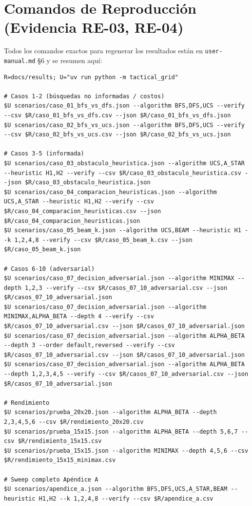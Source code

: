 \section{Comandos de Reproducción (Evidencia RE-03, RE-04)}
\label{sec:comandos-reproduccion}

Todos los comandos exactos para regenerar los resultados están en
\texttt{user-manual.md} §6 y se resumen aquí:

\begin{verbatim}
R=docs/results; U="uv run python -m tactical_grid"

# Casos 1-2 (búsquedas no informadas / costos)
$U scenarios/caso_01_bfs_vs_dfs.json --algorithm BFS,DFS,UCS --verify --csv $R/caso_01_bfs_vs_dfs.csv --json $R/caso_01_bfs_vs_dfs.json
$U scenarios/caso_02_bfs_vs_ucs.json --algorithm BFS,DFS,UCS --verify --csv $R/caso_02_bfs_vs_ucs.csv --json $R/caso_02_bfs_vs_ucs.json

# Casos 3-5 (informada)
$U scenarios/caso_03_obstaculo_heuristica.json --algorithm UCS,A_STAR --heuristic H1,H2 --verify --csv $R/caso_03_obstaculo_heuristica.csv --json $R/caso_03_obstaculo_heuristica.json
$U scenarios/caso_04_comparacion_heuristicas.json --algorithm UCS,A_STAR --heuristic H1,H2 --verify --csv $R/caso_04_comparacion_heuristicas.csv --json $R/caso_04_comparacion_heuristicas.json
$U scenarios/caso_05_beam_k.json --algorithm UCS,BEAM --heuristic H1 --k 1,2,4,8 --verify --csv $R/caso_05_beam_k.csv --json $R/caso_05_beam_k.json

# Casos 6-10 (adversarial)
$U scenarios/caso_07_decision_adversarial.json --algorithm MINIMAX --depth 1,2,3 --verify --csv $R/casos_07_10_adversarial.csv --json $R/casos_07_10_adversarial.json
$U scenarios/caso_07_decision_adversarial.json --algorithm MINIMAX,ALPHA_BETA --depth 4 --verify --csv $R/casos_07_10_adversarial.csv --json $R/casos_07_10_adversarial.json
$U scenarios/caso_07_decision_adversarial.json --algorithm ALPHA_BETA --depth 3 --order default,reversed --verify --csv $R/casos_07_10_adversarial.csv --json $R/casos_07_10_adversarial.json
$U scenarios/caso_07_decision_adversarial.json --algorithm ALPHA_BETA --depth 1,2,3,4,5 --verify --csv $R/casos_07_10_adversarial.csv --json $R/casos_07_10_adversarial.json

# Rendimiento
$U scenarios/prueba_20x20.json --algorithm ALPHA_BETA --depth 2,3,4,5,6 --csv $R/rendimiento_20x20.csv
$U scenarios/prueba_15x15.json --algorithm ALPHA_BETA --depth 5,6,7 --csv $R/rendimiento_15x15.csv
$U scenarios/prueba_15x15.json --algorithm MINIMAX --depth 4,5,6 --csv $R/rendimiento_15x15_minimax.csv

# Sweep completo Apéndice A
$U scenarios/apendice_a.json --algorithm BFS,DFS,UCS,A_STAR,BEAM --heuristic H1,H2 --k 1,2,4,8 --verify --csv $R/apendice_a.csv
\end{verbatim}

